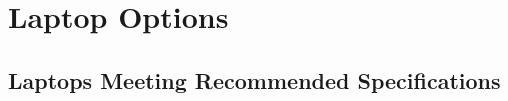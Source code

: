 \documentclass[14pt, letterpaper,twoside]{extreport}
\begin{document}
\pagebreak \hypertarget{laptop-options}{%
    \chapter*{Laptop Options}\label{laptop-options}}

\hypertarget{laptops-meeting-redcommended-specifications}{%
    \section*{Laptops Meeting Recommended
        Specifications}\label{laptops-meeting-redcommended-specifications}}

\end{document}
